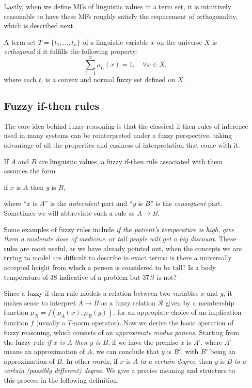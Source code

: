 Lastly, when we define MFs of linguistic values in a term set, it is intuitively reasonable to have these MFs roughly satisfy the requirement of orthogonality, which is described next.

\begin{definition}[Orthogonality] A term set $T= \{t_1, \dots, t_n\}$ of a linguistic variable $x$ on the universe $X$ is \textit{orthogonal} if it fulfills the following property:
\[
\sum_{i=1}^n \mu_{t_i}(x) = 1, \quad \forall x \in X,
\]
where each $t_i$ is a convex and normal fuzzy set defined on $X$.
\end{definition}



\subsection{Fuzzy if-then rules}

The core idea behind fuzzy reasoning is that the classical if-then rules of inference used in many systems can be reinterpreted under a fuzzy perspective, taking advantage of all the properties and easiness of interpretation that come with it.

\begin{definition} If $A$ and $B$ are linguistic values, a fuzzy if-then rule associated with them assumes the form
\begin{center}
  if $x$ is $A$ then $y$ is $B$,
\end{center}
where ``$x$ is $A$'' is the \textit{antecedent} part and ``$y$ is $B$'' is the \textit{consequent} part. Sometimes we will abbreviate such a rule as $A\to B$.
\end{definition}

Some examples of fuzzy rules include \textit{if the patient's temperature is high, give them a moderate dose of medicine}, or \textit{tall people will get a big discount}. These rules are most useful, as we have already pointed out, when the concepts we are trying to model are difficult to describe in exact terms: is there a universally accepted height from which a person is considered to be tall? Is a body temperature of 38\textdegree{} indicative of a problem but $37.9$\textdegree{} is not?

Since a fuzzy if-then rule models a relation between two variables $x$ and $y$, it makes sense to interpret $A\to B$ as a fuzzy relation $\mathcal R$ given by a membership function $\mu_{\mathcal R} = f(\mu_A(x), \mu_B(y))$, for an appropiate choice of an implication function $f$ (usually a $T$-norm operator). Now we derive the basic operation of fuzzy reasoning, which consists of an \textit{approximate modus ponens}. Starting from the fuzzy rule \textit{if $x$ is $A$ then $y$ is $B$}, if we have the premise $x$ is $A'$, where $A'$ means an approximation of $A$, we can conclude that $y$ is $B'$, with $B'$ being an approximation of $B$. In other words, if $x$ is $A$ \textit{to a certain degree}, then $y$ is $B$ \textit{to a certain (possibly different) degree}. We give a precise meaning and structure to this process in the following definition.

